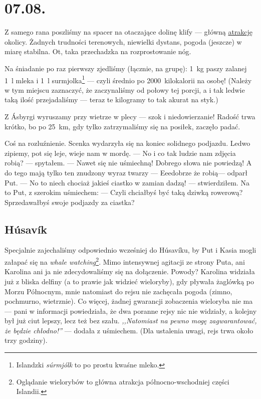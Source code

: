 \chapter*{07.08.}

Z samego rana poszliśmy na spacer na otaczające dolinę klify --- głów\-ną \href{http://www.visithusavik.com/attractions/asbyrgi-canyon/}{atrakcję} okolicy. Żadnych trudności terenowych, niewielki dystans, pogoda (jeszcze) w miarę stabilna. Ot, taka przechadzka na rozprostowanie nóg.

Na śniadanie po raz pierwszy zjedliśmy (łącznie, na grupę): 1~kg paszy zalanej 1~l mleka i 1~l surmjolka\footnote{Islandzki \emph{súrmjólk} to po prostu kwaśne mleko.} --- czyli średnio po 2000~kilokalorii na osobę! (Należy w tym miejscu zaznaczyć, że zaczynaliśmy od połowy tej porcji, a i tak ledwie taką ilość przejadaliśmy --- teraz te kilogramy to tak akurat na styk.)


Z Ásbyrgi wyruszamy przy wietrze w plecy --- szok i niedowierzanie! Radość trwa krótko, bo po 25~km, gdy tylko zatrzymaliśmy się na posiłek, zaczęło padać.

\medskip

Coś na rozluźnienie. Scenka wydarzyła się na koniec solidnego podjazdu. Ledwo zipiemy, pot się leje, wieje nam w mordę. \newline
--- No i co tak ludzie nam zdjęcia robią? --- spytałem. --- Nawet się nie uśmiechną! Dobrego słowa nie powiedzą! A do tego mają tylko ten znudzony wyraz twarzy\textellipsis \newline
--- Eee\textellipsis dobrze że robią\textellipsis --- odparł Put. \newline
--- No to niech chociaż jakieś ciastko w zamian dadzą! --- stwierdziłem. \newline
Na to Put, z szerokim uśmiechem: \newline
--- Czyli chciałbyś być taką dziwką rowerową? Sprzedawałbyś swoje podjazdy za ciastka?

\section*{Húsavík}

Specjalnie zajechaliśmy odpowiednio wcześniej do Húsavíku, by Put i Kasia mogli załapać się na \emph{whale watching}\footnote{Oglądanie wielorybów to główna atrakcja północno-wschodniej części Islandii.}. Mimo intensywnej agitacji ze strony Puta, ani Karolina ani ja nie zdecydowaliśmy się na dołączenie. Powody? Karolina widziała już z bliska delfiny (a to prawie jak widzieć wieloryby), gdy pływała żaglówką po Morzu Północnym, mnie natomiast do rejsu nie zachęcała pogoda (zimno, pochmurno, wietrznie). Co więcej, żadnej gwarancji zobaczenia wieloryba nie ma --- pani w informacji powiedziała, że dwa poranne rejsy nic nie widziały, a kolejny był już ciut lepszy, lecz też bez szału. \emph{,,Natomiast na pewno mogę zagwarantować, że będzie chłodno!''} --- dodała z uśmiechem. (Dla ustalenia uwagi, rejs trwa około trzy godziny).

